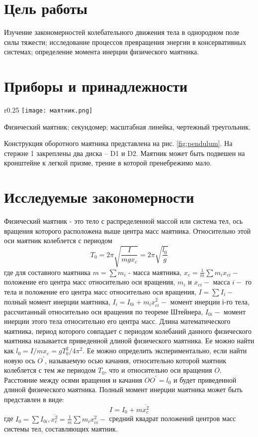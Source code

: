 \section{Цель работы}
Изучение закономерностей колебательного движения тела в однородном поле силы тяжести; исследование процессов превращения энергии в консервативных системах; определение момента инерции физического маятника.

\section{Приборы и принадлежности}
\begin{wrapfigure}[13]{r}{0.25\textwidth}
    \centering
    \texttt{[image: маятник.png]}
    \caption{}
    \label{fig:pendulum}
\end{wrapfigure}
Физический маятник; секундомер; масштабная линейка, чертежный треугольник.

Конструкция оборотного маятника представлена на рис. \ref*{fig:pendulum}. На стержне 1 закреплены два диска – D1 и D2. Маятник может быть подвешен на кронштейне к легкой
призме, трение в которой пренебрежимо мало.

\section{Исследуемые закономерности}

Физический маятник - это тело с распределенной массой или система тел, ось вращения которого расположена выше центра масс маятника. Относительно этой оси маятник колеблется с периодом
\begin{equation}\label{eq:Period}
    T_0=2 \pi \sqrt{\frac{I}{m g x_c}}=2 \pi \sqrt{\frac{l_0}{g}}
\end{equation}
где для составного маятника $m=\sum m_i$ - масса маятника, $x_c=\frac{1}{m} \sum m_i x_{c i}-$ положение его центра масс относительно оси вращения, $m_i$ и $x_{c i}-$ масса $i-$ го тела и положение его центра масс относительно оси вращения, $I=\sum I_i-$ полный момент инерции маятника, $I_i=I_{0 i}+m_i x_{c i}^2-$ момент инерции і-го тела, рассчитанный относительно оси вращения по теореме Штейнера, $I_{0 i}-$ момент инерции этого тела относительно его центра масс. Длина математического маятника, период которого совпадает с периодом колебаний данного физического маятника называется приведенной длиной физического маятника. Ее можно найти как $l_0=I / m x_c=g T_0^2 / 4 \pi^2$. Ее можно определить экспериментально, если найти новую ось $O^{\prime}$, называемую осью качания, относительно которой маятник колеблется с тем же периодом $T_0$, что и относительно оси вращения $O$. Расстояние между осями вращения и качания $O O^{\prime}=l_0$ и будет приведенной длиной физического маятника.
Полный момент инерции маятника может быть представлен в виде:
\begin{equation}\label{eq:fullMomentOfInertion}
    I=I_0+m \overline{x_c^2}
\end{equation}
где $I_0=\sum I_{0 i}, \overline{x_c^2}=\frac{1}{m} \sum m_i x_{c i}^2-$ средний квадрат положений центров масс системы тел, составляющих маятник.


